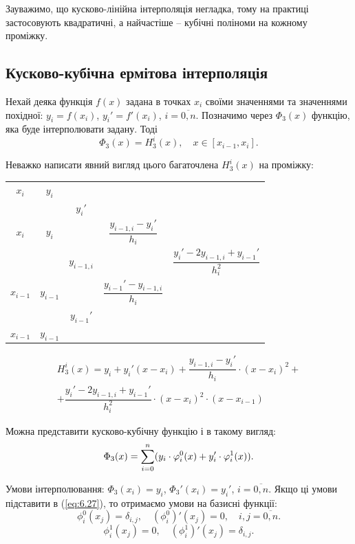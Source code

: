 Зауважимо, що кусково-лінійна інтерполяція негладка, тому на практиці застосовують квадратичні, а найчастіше -- кубічні поліноми на кожному проміжку.

\subsection{Кусково-кубічна ермітова інтерполяція}

Нехай деяка функція $f(x)$ задана в точках $x_i$ своїми значеннями та значеннями похідної: $y_i = f(x_i)$, $y_i'=f'(x_i)$, $i=\overline{0,n}$. Позначимо через $\Phi_3(x)$ функцію, яка буде інтерполювати задану. Тоді 
\begin{equation}
    \label{eq:6.26}
    \Phi_3(x) = H_3^i(x), \quad x \in [x_{i-1},x_i].
\end{equation}

Неважко написати явний вигляд цього багаточлена $H_3^i(x)$ на проміжку:
\begin{table}[H]
    \centering
    \begin{tabular}{c|cccc}
        $x_i$ & $y_i$ & & & \\
        & & $y_i'$ & & \\
        $x_i$ & $y_i$ & & $\dfrac{y_{i-1,i}-y_i'}{h_i}$ & \\
        & & $y_{i-1,i}$ & & $\dfrac{y_i' - 2 y_{i-1,i}+y_{i-1}'}{h_i^2}$ \\
        $x_{i-1}$ & $y_{i-1}$ & & $\dfrac{y_{i-1}'-y_{i-1,i}}{h_i}$ & \\
        & & $y_{i-1}'$ & & \\
        $x_{i-1}$ & $y_{i-1}$ & & & \\
    \end{tabular}
\end{table}

\begin{multline*}
    H_3^i(x) = y_i + y_i'(x-x_i) + \dfrac{y_{i-1,i}-y_i'}{h_i} \cdot (x-x_i)^2 + \\
    + \dfrac{y_i' - 2 y_{i-1,i}+y_{i-1}'}{h_i^2} \cdot (x-x_i)^2 \cdot (x-x_{i-1})
\end{multline*}

Можна представити кусково-кубічну функцію і в такому вигляд:
\begin{equation}
    \label{eq:6.27}
    \Phi_3(x) = \displaystyle\sum\limits_{i=0}^n (y_i \cdot \varphi_i^0 (x) + y_i' \cdot \varphi_i^1(x)).
\end{equation}

Умови інтерполювання: $\Phi_3(x_i)=y_i$, $\Phi_3'(x_i) = y_i'$, $i=\overline{0,n}$. Якщо ці умови підставити в (\ref{eq:6.27}), то отримаємо умови на базисні функції:
\[ \phi_i^0(x_j) = \delta_{i,j}, \quad (\phi_i^0)'(x_j) = 0, \quad i,j=\overline{0,n}. \]
\[ \phi_i^1(x_j) = 0, \quad (\phi_i^1)'(x_j) = \delta_{i,j}. \]

